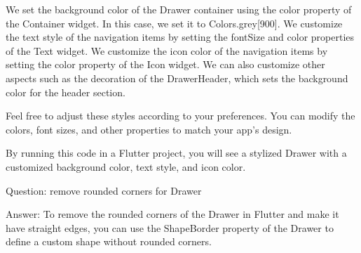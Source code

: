 We set the background color of the Drawer container using the color property of the Container widget. In this case, 
we set it to Colors.grey[900].
We customize the text style of the navigation items by setting the fontSize and color properties of the Text widget.
We customize the icon color of the navigation items by setting the color property of the Icon widget.
We can also customize other aspects such as the decoration of the DrawerHeader, which sets the background color for
the header section.

Feel free to adjust these styles according to your preferences. You can modify the colors, font sizes, and other 
properties to match your app's design.

By running this code in a Flutter project, you will see a stylized Drawer with a customized background color, text 
style, and icon color.

Question: remove rounded corners for Drawer

Answer: To remove the rounded corners of the Drawer in Flutter and make it have straight edges, you can use the 
ShapeBorder property of the Drawer to define a custom shape without rounded corners.

